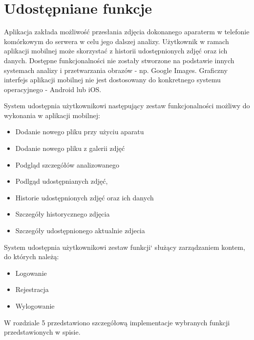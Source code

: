 \section{Udostępniane funkcje}
Aplikacja zakłada możliwość przesłania zdjęcia dokonanego aparaterm w telefonie komórkowym do serwera w celu jego dalszej analizy. Użytkownik w ramach aplikacji mobilnej może skorzystać z historii udostępnionych zdjęć oraz ich danych. Dostępne funkcjonalności nie zostały stworzone na podstawie innych systemach analizy i przetwarzania obrazów - np. Google Images. Graficzny interfejs aplikacji mobilnej nie jest dostosowany do konkretnego systemu operacyjnego - Android lub iOS. 

System udostępnia użytkownikowi następujący zestaw funkcjonalności możliwy do wykonania w aplikacji mobilnej:
\begin{itemize}[align=left]

	\item Dodanie nowego pliku przy użyciu aparatu
	\item Dodanie nowego pliku z galerii zdjęć
	\item Podgląd szczegółów analizowanego 
	\item Podlgąd udostępnianych zdjęć,
	\item Historie udostępnionych zdjęć oraz ich danych
	\item Szczegóły historycznego zdjęcia
	\item Szczegóły udostępnionego aktualnie zdjecia
\end{itemize}

System udostępnia użytkownikowi zestaw funkcji`  służący zarządzaniem kontem, do których należą:
\begin{itemize}[align=left]
	\item Logowanie
	\item Rejestracja
	\item Wylogowanie
	
	
\end{itemize}


W rozdziale 5 przedstawiono szczegółową implementacje wybranych funkcji przedstawionych w spisie.